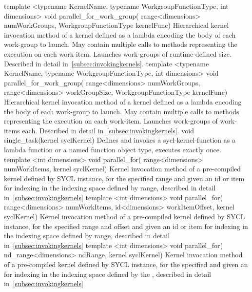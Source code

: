   \addRowFourL
    {template <typename KernelName, typename WorkgroupFunctionType, int dimensions>}
    {void parallel_for_work_group(}
    { range<dimensions> numWorkGroups,}
    { WorkgroupFunctionType kernelFunc)}
    {
      Hierarchical kernel invocation method of a kernel defined as a
      lambda encoding the body of each work-group to launch. May
      contain multiple calls to
       methods representing the
      execution on each work-item. Launches
       work-groups of runtime-defined
      size. Described in detail in~\ref{subsec:invokingkernels}.
    }
\addRowFiveL
  {template <typename KernelName, typename WorkgroupFunctionType, int dimensions>}
  {void parallel_for_work_group(}
  { range<dimensions> numWorkGroups,}
  { range<dimensions> workGroupSize,}
  { WorkgroupFunctionType kernelFunc)}
  {
    Hierarchical kernel invocation method of a kernel defined as a
    lambda encoding the body of each work-group to launch. May
    contain multiple calls to
     methods representing the
    execution on each work-item. Launches
     work-groups of
     work-items each. Described in
    detail in~\ref{subsec:invokingkernels}.
  }
  \addRow
    {void single_task(kernel syclKernel)}
    {
      Defines and invokes a \gls{sycl-kernel-function} as a lambda function
      or a named function object type, executes exactly once.
    }
  \addRowThreeL
    { template <int dimensions> void parallel_for(}
    { range<dimensions> numWorkItems,}
    { kernel syclKernel)}
    {
      Kernel invocation method of a pre-compiled \gls{kernel} defined by SYCL
       instance,
      for the specified range and given an id or item for indexing in the
      indexing space defined by range,
      described in detail in~\ref{subsec:invokingkernels}
    }
  \addRowThreeL
    { template <int dimensions> void parallel_for(}
    { range<dimensions> numWorkItems, }
    { id<dimensions> workItemOffset, kernel syclKernel) }
    {
      Kernel invocation method of a pre-compiled \gls{kernel} defined by SYCL
       instance,
      for the specified range and offset and given an id or item for indexing in the
      indexing space defined by range,
      described in detail in~\ref{subsec:invokingkernels}
    }
   \addRowThreeL
    { template <int dimensions> void parallel_for(}
    { nd_range<dimensions> ndRange,}
    { kernel syclKernel)}
    {
      Kernel invocation method of a pre-compiled \gls{kernel} defined by SYCL  instance,
      for the specified  and given an 
      for indexing in the indexing space defined by the ,
      described in detail in~\ref{subsec:invokingkernels}
    }
\completeTable

